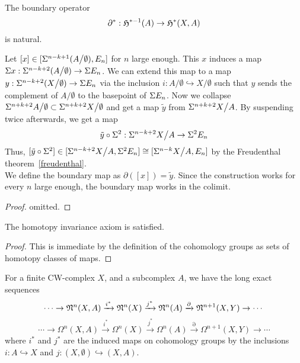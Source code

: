 \documentclass[a4paper,11pt]{article}
\begin{document}
\begin{lemma}[Naturality]\label{coboundary}
    The boundary operator
    \[\partial^\ast:\mathfrak{H}^{\ast-1}(A)\to\mathfrak{H}^\ast(X,A)\]
    is natural.
\end{lemma}

\begin{remark}
    Let \([x]\in[\Sigma^{n-k+1}(A\big/\emptyset),E_n]\) for \(n\) large enough. This \(x\) induces a map \(\Sigma x:\Sigma^{n-k+2}(A\big/\emptyset)\to\Sigma E_n\). We can extend this map to a map \(y:\Sigma^{n-k+2}(X\big/\emptyset)\to\Sigma E_n\) via the inclusion \(i:A\big/\emptyset\hookrightarrow X\big/\emptyset\) such that \(y\) sends the complement of \(A\big/\emptyset\) to the basepoint of \(\Sigma E_n\). 
    Now we collapse \(\Sigma^{n+k+2}A\big/\emptyset\subset\Sigma^{n+k+2}X\big/\emptyset\) and get a map \(\tilde y\) from \(\Sigma^{n+k+2}X\big/A\).
    By suspending twice afterwards, we get a map
    \[\tilde y\circ\Sigma^2:\Sigma^{n-k+2}X\big/A\to \Sigma^2 E_n\]
    Thus, \([\tilde y\circ\Sigma^2]\in[\Sigma^{n-k+2}X\big/A,\Sigma^2 E_n]\cong[\Sigma^{n-k}X\big/A,E_n]\) by the Freudenthal theorem\ \ref{freudenthal}.\\
    We define the boundary map as \(\partial([x])=\tilde y\). Since the construction works for every \(n\) large enough, the boundary map works in the colimit.
\end{remark}

\begin{proof}
    omitted.
\end{proof}

\begin{lemma}\label{cohtpy inv}
    The homotopy invariance axiom is satisfied.
\end{lemma}

\begin{proof}
    This is immediate by the definition of the cohomology groups as sets of homotopy classes of maps.
\end{proof}

\begin{lemma}\label{coles}
    For a finite CW-complex \(X\), and a subcomplex \(A\), we have the long exact sequences
    \[\cdots\to\mathfrak{N}^n(X,A)\xrightarrow{i^\ast}\mathfrak{N}^n(X)\xrightarrow{j^\ast}\mathfrak{N}^n(A)\xrightarrow{\partial}\mathfrak{N}^{n+1}(X,Y)\to\cdots\]
    \[\cdots\to\Omega^n(X,A)\xrightarrow{i^\ast}\Omega^n(X)\xrightarrow{j^\ast}\Omega^n(A)\xrightarrow{\partial}\Omega^{n+1}(X,Y)\to\cdots\]
    where \(i^\ast\) and \(j^\ast\) are the induced maps on cohomology groups by the inclusions \(i:A\hookrightarrow X\) and \(j:(X,\emptyset)\hookrightarrow (X,A)\).
\end{lemma}
\end{document}
